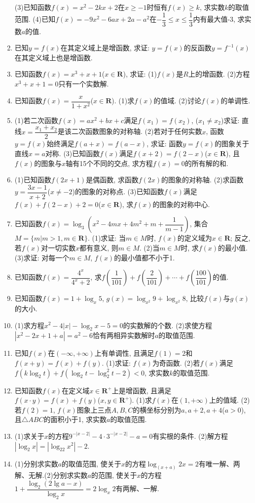 \documentclass[10pt,a4paper]{article}
\begin{document}
\begin{enumerate}[1.]
(3)已知函数$f(x)=x^2-2kx+2$在$x\ge -1$时恒有$f(x)\ge k$, 求实数$k$的取值范围.
(4)已知$f(x)=-9x^2-6ax+2a-a^2$在$-\dfrac 13\le x\le \dfrac 13$内有最大值-3, 求实数$a$的值.
\item 已知$y=f(x)$在其定义域上是增函数, 求证: $y=f(x)$的反函数$y=f^{-1}(x)$在其定义域上也是增函数.
\item 已知函数$f(x)=x^3+x+1$($x\in \mathbf{R}$), 求证:
(1)$f(x)$是$R$上的增函数.
(2)方程$x^3+x+1=0$只有一个实数解.
\item 已知函数$f(x)=\dfrac x{1+x^2}$($x\in \mathbf{R}$).
(1)求$f(x)$的值域.			(2)讨论$f(x)$的单调性.
\item (1)若二次函数$f(x)=ax^2+bx+c$满足$f(x_1)=f(x_2)$, ($x_1\ne x_2$)求证: 直线$x=\dfrac{x_1+x_2}2$是该二次函数图象的对称轴.
(2)若对于任何实数$x$, 函数$y=f(x)$始终满足$f(a+x)=f(a-x)$, 求证: 函数$y=f(x)$的图象关于直线$x=a$对称.
(3)已知函数$f(x)$满足$f(x+2)=f(2-x)$($x\in \mathbf{R}$), 且$f(x)$的图象与$x$轴有15个不同的交点, 求方程$f(x)=0$的所有解的和.
\item (1)已知函数$f(2x+1)$是偶函数, 求函数$f(2x)$的图象的对称轴.
(2)求函数$y=\dfrac{3x-1}{x+2}$($x\ne -2$)的图象的对称点.
(3)已知函数$f(x)$满足$f(x)+f(2-x)+2=0$($x\in \mathbf{R}$), 求$f(x)$的图象的对称中心.
\item 已知函数$f(x)=\log _3(x^2-4mx+4m^2+m+\dfrac 1{m-1})$, 集合$M=\{m|m>1,m\in \mathbf{R}\}$.
(1)求证: 当$m\in M$时, $f(x)$的定义域为$x\in \mathbf{R}$; 反之, 若$f(x)$对一切实数$x$都有意义, 则$m\in M$.
(2)当$m\in M$时, 求$f(x)$的最小值.
(3)求证: 对每一个$m\in M$, $f(x)$的最小值都不小于1.
\item 已知函数$f(x)=\dfrac{4^x}{4^x+2}$, 求$f(\dfrac 1{101})+f(\dfrac 2{101})+\cdots +f(\dfrac{100}{101})$的值.
\item 已知函数$f(x)=1+\log _x5$, $g(x)=\log _{x^2}9+\log _{x^2}8$, 比较$f(x)$与$g(x)$的大小.
\item (1)求方程$x^2-4|x|-\log _2x-5=0$的实数解的个数.
(2)求使方程$|x^2-2x+1+a|=a^2-6$恰有两相异实数解时$a$的取值范围.
\item 已知$f(x)$在$(-\infty ,+\infty)$上有单调性, 且满足$f(1)=2$和$f(x+y)=f(x)+f(y)$.
(1)求证: $f(x)$为奇函数.
(2)若$f(x)$满足$f(k\log _2t)+f(\log _2t-\log _2^2t-2)<0$, 求实数$k$的取值范围.
\item 已知函数$f(x)$在定义域$x\in \mathbf{R}^+$上是增函数, 且满足$f(x\cdot y)=f(x)+f(y)$($x,y\in \mathbf{R}^+$).
(1)求$f(x)$在$(1,+\infty)$上的值域.
(2)若$f(2)=1$, $f(x)$图象上三点$A,B,C$的横坐标分别为$a,a+2,a+4$($a>0$), 且$\triangle ABC$的面积小于1, 求实数$a$的取值范围.
\item (1)求关于$x$的方程$9^{-|x-2|}-4\cdot 3^{-|x-2|}-a=0$有实根的条件.
(2)解方程$|\log _2x|=|\log _22x^2|-2$.
\item (1)分别求实数$a$的取值范围, 使关于$x$的方程$\log _{(x+a)}2x=2$有唯一解、两解、无解.(2)分别求实数$a$的范围, 使关于$x$的方程$1+\dfrac{\log _2(2\lg a-x)}{\log _2x}=2\log _x2$有两解、一解.


\end{enumerate}
\end{document}
